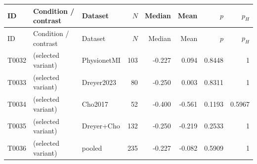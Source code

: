 \begin{longtable}{p{.45in}p{2.6in}p{.75in}rrrrr}
\toprule
ID & Condition / contrast & Dataset & $N$ & Median & Mean & $p$ & $p_H$ \\
\midrule
\endfirsthead
\toprule
ID & Condition / contrast & Dataset & $N$ & Median & Mean & $p$ & $p_H$ \\
\midrule
\endhead
T0032 & (selected variant) & PhysionetMI & 103 & -0.227 & 0.094 & 0.8448 & 1 \\
T0033 & (selected variant) & Dreyer2023 & 80 & -0.250 & 0.003 & 0.8311 & 1 \\
T0034 & (selected variant) & Cho2017 & 52 & -0.400 & -0.561 & 0.1193 & 0.5967 \\
T0035 & (selected variant) & Dreyer+Cho & 132 & -0.250 & -0.219 & 0.2533 & 1 \\
T0036 & (selected variant) & pooled & 235 & -0.227 & -0.082 & 0.5909 & 1 \\
\bottomrule
\end{longtable}
